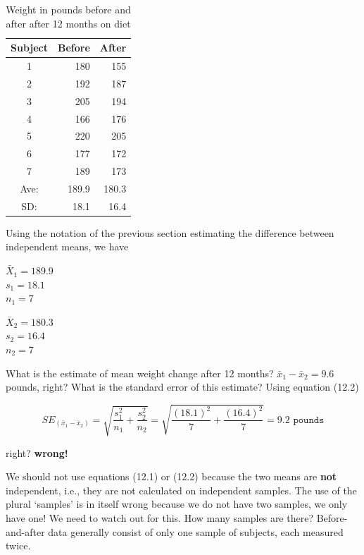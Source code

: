\documentclass[11pt, chapterprefix=true]{scrbook}\usepackage[]{graphicx}\usepackage[]{color}
\begin{document}
\begin{table}[ht]
\centering
\caption{Weight in pounds before and after after 12 months on diet}
\begin{tabular}{@{} crr @{}} \hline
Subject & Before & After \\ \hline
1 & 180 & 155 \\
2 & 192 & 187 \\
3 & 205 & 194 \\
4 & 166 & 176 \\
5 & 220 & 205 \\
6 & 177 & 172 \\
7 & 189 & 173 \\ \hline
Ave: & 189.9 & 180.3 \\
SD:  & 18.1 & 16.4 \\ \hline
\end{tabular}
\end{table}

Using the notation of the previous section estimating the difference between independent means, we have

\begin{center}
\begin{minipage}[ht]{3cm}

$\bar{X}_1 = 189.9$ \\
$s_1 = 18.1$ \\
$n_1 = 7$ 
\end{minipage}
\begin{minipage}[ht]{3cm}

$\bar{X}_2 = 180.3$ \\
$s_2 = 16.4$ \\
$n_2 = 7$ 
\end{minipage}
\end{center}

What is the estimate of mean weight change after 12 months?  $\bar{x}_1 - \bar{x}_2 = 9.6$ pounds, right?  What is the standard error of this estimate? Using equation (12.2) 

\begin{equation*}
SE_{(\bar{x}_1 - \bar{x}_2)} = \sqrt{\frac{s_1^2}{n_1}  + \frac{s_2^2}{n_2} } = \sqrt{\frac{(18.1)^2}{7}  + \frac{(16.4)^2}{7} } = 9.2 \texttt{ pounds}
\end{equation*}

right?  \textbf{wrong!}

We should not use equations (12.1) or (12.2) because the two means are \textbf{not} independent, i.e., they are not calculated on independent samples. The use of the plural `samples' is in itself wrong because we do not have two samples, we only have one! We need to watch out for this.  How many samples are there?  Before-and-after data generally consist of only one sample of subjects, each measured twice.
\end{document}
